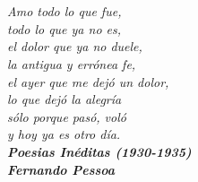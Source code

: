 \chapter*{}


\chapter*{}



\chapter*{}
\begin{flushright}
	\textit{Amo todo lo que fue,\\
		todo lo que ya no es, \\
		el dolor que ya no duele,\\
		la antigua y err\'{o}nea fe,\\
		el ayer que me dej\'{o} un dolor, \\
		lo que dejó la alegr\'{i}a\\ 
		s\'{o}lo porque pas\'{o}, vol\'{o}\\
		y hoy ya es otro d\'{i}a.}\\
	\vspace{1cm}
	\textbf{\textit{Poesias In\'{e}ditas (1930-1935)}\\
		\textit{Fernando Pessoa}}\\
\end{flushright}